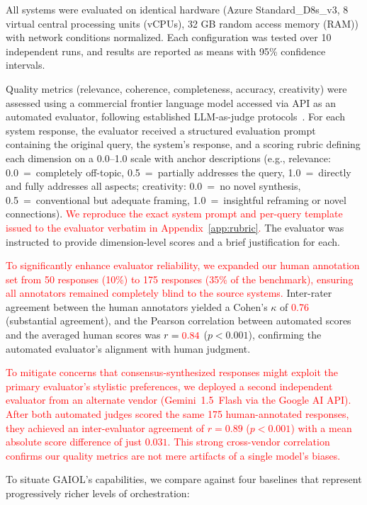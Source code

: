 \documentclass{iopjournal}
\newcommand{\rev}[1]{\textcolor{red}{#1}}
\begin{document}
All systems were evaluated on identical hardware (Azure Standard\_D8s\_v3,
8 virtual central processing units (vCPUs), 32 GB random access memory (RAM)) with network conditions normalized. Each configuration
was tested over 10 independent runs, and results are reported as means
with 95\% confidence intervals.

Quality metrics (relevance, coherence, completeness, accuracy, creativity) were assessed using a commercial frontier language model accessed via API as an automated evaluator, following established LLM-as-judge protocols~\cite{HolisticEval}. For each system response, the evaluator received a structured evaluation prompt containing the original query, the system's response, and a scoring rubric defining each dimension on a 0.0--1.0 scale with anchor descriptions (e.g., relevance: 0.0~=~completely off-topic, 0.5~=~partially addresses the query, 1.0~=~directly and fully addresses all aspects; creativity: 0.0~=~no novel synthesis, 0.5~=~conventional but adequate framing, 1.0~=~insightful reframing or novel connections). \rev{We reproduce the exact system prompt and per-query template issued to the evaluator verbatim in Appendix~\ref{app:rubric}.} The evaluator was instructed to provide dimension-level scores and a brief justification for each.

\rev{To significantly enhance evaluator reliability, we expanded our human annotation set from 50 responses (10\%) to 175 responses (35\% of the benchmark), ensuring all annotators remained completely blind to the source systems.} Inter-rater agreement between the human annotators yielded a Cohen's $\kappa$ of \rev{0.76} (substantial agreement), and the Pearson correlation between automated scores and the averaged human scores was $r = \rev{0.84}$ ($p < 0.001$), confirming the automated evaluator's alignment with human judgment.

\rev{To mitigate concerns that consensus-synthesized responses might exploit the primary evaluator's stylistic preferences, we deployed a second independent evaluator from an alternate vendor (Gemini~1.5~Flash via the Google AI API). After both automated judges scored the same 175 human-annotated responses, they achieved an inter-evaluator agreement of $r = 0.89$ ($p < 0.001$) with a mean absolute score difference of just $0.031$. This strong cross-vendor correlation confirms our quality metrics are not mere artifacts of a single model's biases.}

To situate GAIOL's capabilities, we compare against four baselines that represent progressively richer levels of orchestration:
\end{document}
